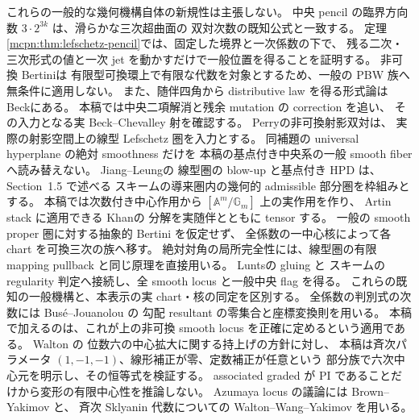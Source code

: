 これらの一般的な幾何機構自体の新規性は主張しない。
中央 pencil の臨界方向数 $3\cdot2^{3k}$ は、滑らかな三次超曲面の
双対次数の既知公式\cite[Section~7.1, Example~7.4]{CMOTevelevDuality}と一致する。
定理\ref{mcpn:thm:lefschetz-pencil}では、固定した境界と一次係数の下で、
残る二次・三次形式の値と一次 jet を動かすだけで一般位置を得ることを証明する。
非可換 Bertini\cite[Proposition~2.1]{CMORSVBertini}は
有限型可換環上で有限な代数を対象とするため、一般の PBW 族へ無条件に適用しない。
また、随伴四角から distributive law を得る形式論は
Beck\cite[Section~3, Proposition]{CMOBeckDistributiveLaws}にある。
本稿では中央二項解消と残余 mutation の correction を追い、
その入力となる実 Beck--Chevalley 射を確認する。
Perry\cite[Lemma~7.18, Proposition~7.19]{CRSPerry}の非可換射影双対は、
実際の射影空間上の線型 Lefschetz 圏を入力とする。
同補題の universal hyperplane の絶対 smoothness だけを
本稿の基点付き中央系の一般 smooth fiber へ読み替えない。
Jiang--Leung\cite[Theorems~3.3, 4.5]{CMOJiangLeungBlowup}の
線型圏の blow-up と基点付き HPD は、Section~1.5 で述べる
スキームの導来圏内の幾何的 admissible 部分圏を枠組みとする。
本稿では次数付き中心作用から $[\mathbb A^m/\mathbb G_m]$ 上の実作用を作り、
Artin stack に適用できる Khan\cite[Theorem~C and Proposition~4.2]{CMOKhanBlowups}の
分解を実随伴とともに tensor する。
一般の smooth proper 圏に対する抽象的 Bertini を仮定せず、
全係数の一中心核によって各 chart を可換三次の族へ移す。
絶対対角の局所完全性には、線型圏の有限 mapping pullback
\cite[Lemma~6.4 and proof of Theorem~6.11]{CMOAntieauGepnerDescent}と同じ原理を直接用いる。
Lunts\cite[Propositions~3.11, 3.13]{CMOLuntsResolution}の gluing と
スキームの regularity 判定へ接続し、全 smooth locus と一般中央 flag を得る。
これらの既知の一般機構と、本表示の実 chart・核の同定を区別する。
全係数の判別式の次数には Bus\'e--Jouanolou
\cite[Propositions~2.4, 4.13]{CMOBuseJouanolouDiscriminant}の
勾配 resultant の零集合と座標変換則を用いる。
本稿で加えるのは、これが上の非可換 smooth locus を正確に定めるという適用である。
Walton \cite[Definition~V.1, Remark~V.16]{CMOWaltonThesis}の
位数六の中心拡大に関する持上げの方針に対し、
本稿は斉次パラメータ $(1,-1,-1)$、線形補正が零、定数補正が任意という
部分族で六次中心元を明示し、その恒等式を検証する。
associated graded が PI であることだけから変形の有限中心性を推論しない。
Azumaya locus の議論には Brown--Yakimov
\cite[Corollary~5.2]{CMOBrownYakimov}と、
斉次 Sklyanin 代数についての Walton--Wang--Yakimov
\cite[Theorem~1.3(1), Lemma~5.4]{CMOWaltonWangYakimov}を用いる。

